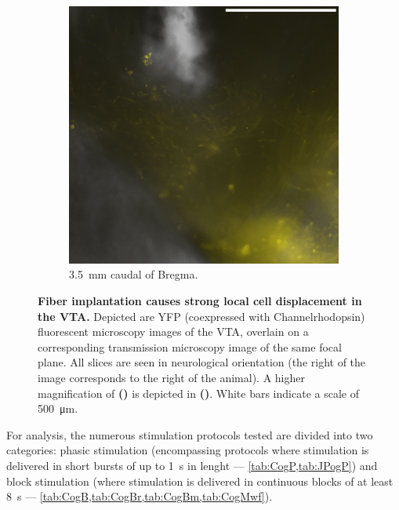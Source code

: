 \begin{figure}[h!]
\begin{subfigure}{.43\textwidth}
		\label{fig:h6589}
	\end{subfigure}
	\begin{subfigure}{.2728\textwidth}
		\centering
		\includegraphics[width=\textwidth]{img/sub-6589_slice-a4_zoom-10_scene-2_transmission-yfp-comb_straight.png}
                \caption{\SI{3.5}{\milli\meter} caudal of Bregma.}
		\label{fig:h6589z}
	\end{subfigure}
        \vspace{-.5em}
	\caption{
		\textbf{Fiber implantation causes strong local cell displacement in the VTA.}
                Depicted are YFP (coexpressed with Channelrhodopsin) fluorescent microscopy images of the VTA, overlain on a corresponding transmission microscopy image of the same focal plane.
                All slices are seen in neurological orientation (the right of the image corresponds to the right of the animal).
                A higher magnification of \textbf{()} is depicted in \textbf{()}.
                White bars indicate a scale of \SI{500}{\micro\meter}.
                }
	\label{fig:h}
\end{figure}

For analysis, the numerous stimulation protocols tested are divided into two categories: phasic stimulation (encompassing protocols where stimulation is delivered in short bursts of up to \SI{1}{\second} in lenght --- \cref{tab:CogP,tab:JPogP}) and block stimulation (where stimulation is delivered in continuous blocks of at least \SI{8}{\second} --- \cref{tab:CogB,tab:CogBr,tab:CogBm,tab:CogMwf}).

